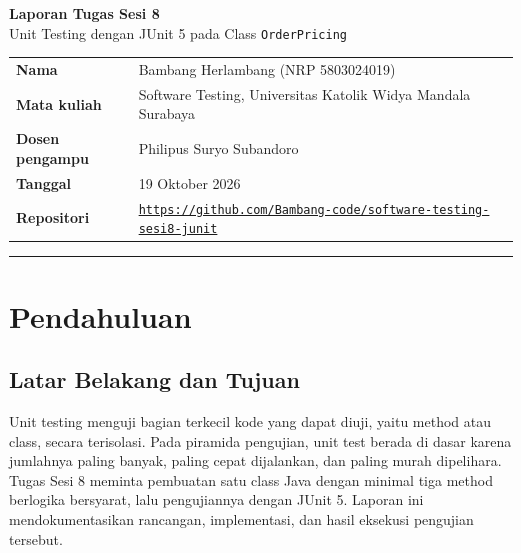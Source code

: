 \documentclass[11pt,a4paper]{article}
\begin{document}
\begin{center}
  {\LARGE\bfseries Laporan Tugas Sesi 8}\\[6pt]
  {\large Unit Testing dengan JUnit 5 pada Class \texttt{OrderPricing}}\\[10pt]
\end{center}

\begin{tabularx}{\textwidth}{@{}P{3.4cm}Y@{}}
  \textbf{Nama}            & Bambang Herlambang (NRP 5803024019) \\
  \textbf{Mata kuliah}     & Software Testing, Universitas Katolik Widya Mandala Surabaya \\
  \textbf{Dosen pengampu}  & Philipus Suryo Subandoro \\
  \textbf{Tanggal}         & 19 Oktober 2026 \\
  \textbf{Repositori}      & \href{https://github.com/Bambang-code/software-testing-sesi8-junit}{\small\texttt{https://github.com/Bambang-code/software-testing-sesi8-junit}} \\
\end{tabularx}
\vspace{4pt}
\hrule

\section{Pendahuluan}

\subsection{Latar Belakang dan Tujuan}
Unit testing menguji bagian terkecil kode yang dapat diuji, yaitu method atau class, secara terisolasi. Pada piramida pengujian, unit test berada di dasar karena jumlahnya paling banyak, paling cepat dijalankan, dan paling murah dipelihara. Tugas Sesi 8 meminta pembuatan satu class Java dengan minimal tiga method berlogika bersyarat, lalu pengujiannya dengan JUnit 5. Laporan ini mendokumentasikan rancangan, implementasi, dan hasil eksekusi pengujian tersebut.
\end{document}
